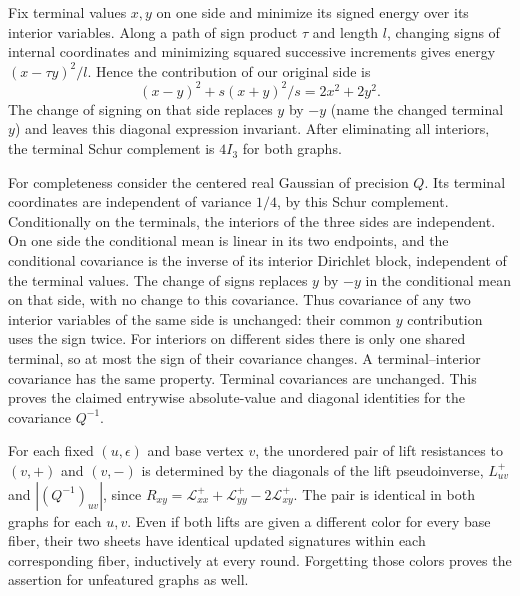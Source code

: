 \documentclass[10pt]{article}
\begin{document}
Fix terminal values $x,y$ on one side and minimize its signed energy over its interior variables. Along a path of sign product $\tau$ and length $l$, changing signs of internal coordinates and minimizing squared successive increments gives energy $(x-\tau y)^2/l$. Hence the contribution of our original side is
\[
 (x-y)^2+s(x+y)^2/s=2x^2+2y^2.
\]
The change of signing on that side replaces $y$ by $-y$ (name the changed terminal $y$) and leaves this diagonal expression invariant. After eliminating all interiors, the terminal Schur complement is $4I_3$ for both graphs.

For completeness consider the centered real Gaussian of precision $Q$. Its terminal coordinates are independent of variance $1/4$, by this Schur complement. Conditionally on the terminals, the interiors of the three sides are independent. On one side the conditional mean is linear in its two endpoints, and the conditional covariance is the inverse of its interior Dirichlet block, independent of the terminal values. The change of signs replaces $y$ by $-y$ in the conditional mean on that side, with no change to this covariance. Thus covariance of any two interior variables of the same side is unchanged: their common $y$ contribution uses the sign twice. For interiors on different sides there is only one shared terminal, so at most the sign of their covariance changes. A terminal--interior covariance has the same property. Terminal covariances are unchanged. This proves the claimed entrywise absolute-value and diagonal identities for the covariance $Q^{-1}$.

For each fixed $(u,\epsilon)$ and base vertex $v$, the unordered pair of lift resistances to $(v,+)$ and $(v,-)$ is determined by the diagonals of the lift pseudoinverse, $L^+_{uv}$ and $|(Q^{-1})_{uv}|$, since $R_{xy}=\mathcal L^+_{xx}+\mathcal L^+_{yy}-2\mathcal L^+_{xy}$. The pair is identical in both graphs for each $u,v$. Even if both lifts are given a different color for every base fiber, their two sheets have identical updated signatures within each corresponding fiber, inductively at every round. Forgetting those colors proves the assertion for unfeatured graphs as well.
\end{document}

